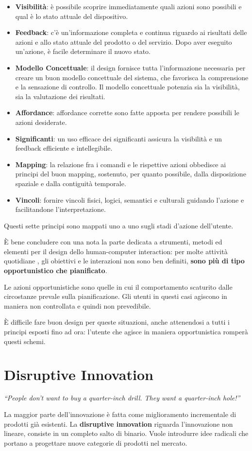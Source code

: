 \documentclass[a4paper,11pt,oneside]{book}
\begin{document}
\begin{itemize}
	\item \textbf{Visibilità}: è possibile scoprire immediatamente quali azioni sono possibili e qual è lo stato attuale del dispositivo.
	\item \textbf{Feedback}: c'è un'informazione completa e continua riguardo ai risultati delle azioni e allo stato attuale del prodotto o del servizio. Dopo aver eseguito un'azione, è facile determinare il nuovo stato.
	\item \textbf{Modello Concettuale}: il design fornisce tutta l'informazione necessaria per creare un buon modello concettuale del sistema, che favorisca la comprensione e la sensazione di controllo. Il modello concettuale potenzia sia la visibilità, sia la valutazione dei risultati.
	\item \textbf{Affordance}: affordance corrette sono fatte apposta per rendere possibili le azioni desiderate.
	\item \textbf{Significanti}: un uso efficace dei significanti assicura la visibilità e un feedback efficiente e intellegibile.
	\item \textbf{Mapping}: la relazione  fra i comandi e le rispettive azioni obbedisce ai principi del buon mapping, sostenuto, per quanto possibile, dalla disposizione spaziale e dalla contiguità temporale.
	\item \textbf{Vincoli}: fornire vincoli fisici, logici, semantici e culturali guidando l'azione e facilitandone l'interpretazione.
\end{itemize}
Questi sette principi sono mappati uno a uno sugli stadi d'azione dell'utente.

È bene concludere con una nota la parte dedicata a strumenti, metodi ed elementi per il design dello human-computer interaction: per molte attività quotidiane , gli obiettivi e le interazioni non sono ben definiti, \textbf{sono più di tipo opportunistico che pianificato}.

Le azioni opportunistiche sono quelle in cui il comportamento scaturito dalle circostanze prevale sulla pianificazione. Gli utenti in questi casi agiscono in maniera non controllata e quindi non prevedibile.

È difficile fare buon design per queste situazioni, anche attenendosi a tutti i principi esposti fino ad ora: l'utente che agisce in maniera opportunistica romperà questi schemi.

\pagebreak

\section{Disruptive Innovation}
\begin{flushleft}
	\textit{“People don’t want to buy a quarter-inch drill. They want a quarter-inch hole!”}
\end{flushleft}
La maggior parte dell'innovazione è fatta come miglioramento incrementale di prodotti già esistenti. La \textbf{disruptive innovation} riguarda l'innovazione non lineare, consiste in un completo salto di binario. Vuole introdurre idee radicali che portano a progettare nuove categorie di prodotti nel mercato.
\end{document}
